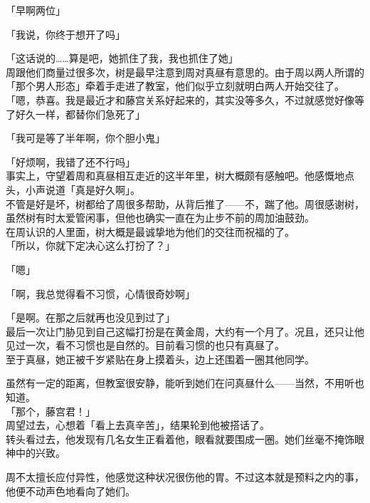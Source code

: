 「早啊两位」

「我说，你终于想开了吗」

「这话说的……算是吧，她抓住了我，我也抓住了她」\\

周跟他们商量过很多次，树是最早注意到周对真昼有意思的。由于周以两人所谓的「那个男人形态」牵着手走进了教室，他们似乎立刻就明白两人开始交往了。\\

「嗯，恭喜。我是最近才和藤宫关系好起来的，其实没等多久，不过就感觉好像等了好久一样，都替你们急死了」

「我可是等了半年啊，你个胆小鬼」

「好烦啊，我错了还不行吗」\\

事实上，守望着周和真昼相互走近的这半年里，树大概颇有感触吧。他感慨地点头，小声说道「真是好久啊」。\\

不管是好是坏，树都给了周很多帮助，从背后推了——不，踹了他。周很感谢树，虽然树有时太爱管闲事，但他也确实一直在为止步不前的周加油鼓劲。\\

在周认识的人里面，树大概是最诚挚地为他们的交往而祝福的了。\\

「所以，你就下定决心这么打扮了？」

「嗯」

「啊，我总觉得看不习惯，心情很奇妙啊」

「是啊。在那之后就再也没见到过了」\\

最后一次让门胁见到自己这幅打扮是在黄金周，大约有一个月了。况且，还只让他见过一次，看不习惯也是自然的。目前看习惯的也只有真昼了。\\

至于真昼，她正被千岁紧贴在身上摸着头，边上还围着一圈其他同学。

虽然有一定的距离，但教室很安静，能听到她们在问真昼什么——当然，不用听也知道。\\

「那个，藤宫君！」\\

周望过去，心想着「看上去真辛苦」，结果轮到他被搭话了。\\

转头看过去，他发现有几名女生正看着他，眼看就要围成一圈。她们丝毫不掩饰眼神中的兴致。

周不太擅长应付异性，他感觉这种状况很伤他的胃。不过这本就是预料之内的事，他便不动声色地看向了她们。\\

